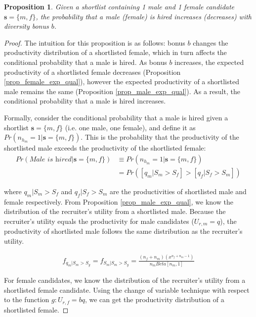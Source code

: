 \documentclass[11pt]{article}
\newtheorem{proposition}{Proposition}
\begin{document}
\begin{proposition}
    Given a shortlist containing 1 male and 1 female candidate $\bm{s} = \{m,f\}$, the probability that a male (female) is hired increases (decreases) with diversity bonus $b$.
\end{proposition}

\begin{proof}
    The intuition for this proposition is as follows: bonus $b$ changes the productivity distribution of a shortlisted female, which in turn affects the conditional probability that a male is hired. As bonus $b$ increases, the expected productivity of a shortlisted female decreases (Proposition \ref{prop_female_exp_qual}), however the expected productivity of a shortlisted male remains the same (Proposition \ref{prop_male_exp_qual}). As a result, the conditional probability that a male is hired increases.

    Formally, consider the conditional probability that a male is hired given a shortlist $\bm{s}=\{m,f\}$ (i.e. one male, one female), and define it as $Pr(n_{h_m}=1|\bm{s}=\{m,f\})$. This is the probability that the productivity of the shortlisted male exceeds the productivity of the shortlisted female:
    \begin{align*}
        Pr(\textit{Male is hired}|\bm{s}=\{m,f\}) & \equiv Pr(n_{h_m}=1|\bm{s}=\{m,f\})     \\
                                                  & = Pr([q_m|S_m > S_f] > [q_f|S_f > S_m])
    \end{align*}

    where $q_m|S_m > S_f$ and $q_f|S_f > S_m$ are the productivities of shortlisted male and female respectively. From Proposition \ref{prop_male_exp_qual}, we know the distribution of the recruiter's utility from a shortlisted male. Because the recruiter's utility equals the productivity for male candidates ($U_{r,m} = q$), the productivity of shortlisted male follows the same distribution as the recruiter's utility.

    \begin{align*}
        f_{q_m|S_m > S_y} = f_{S_m|S_m > S_y} = \frac{(n_f+n_m)(x^{n_f+n_m-1})}{n_mBeta[n_m,1]}
    \end{align*}

    For female candidates, we know the distribution of the recruiter's utility from a shortlisted female candidate. Using the change of variable technique with respect to the function $g: U_{r,f} = bq$, we can get the productivity distribution of a shortlisted female.


\end{proof}
\end{document}
